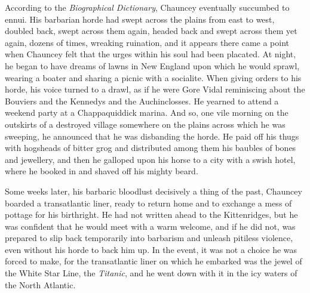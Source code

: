 According to the \emph{Biographical Dictionary}, Chauncey eventually succumbed to ennui. His barbarian horde had swept across the plains from east to west, doubled back, swept across them again, headed back and swept across them yet again, dozens of times, wreaking ruination, and it appears there came a point when Chauncey felt that the urges within his soul had been placated. At night, he began to have dreams of lawns in New England upon which he would sprawl, wearing a boater and sharing a picnic with a socialite. When giving orders to his horde, his voice turned to a drawl, as if he were Gore Vidal reminiscing about the Bouviers and the Kennedys and the Auchinclosses. He yearned to attend a weekend party at a Chappaquiddick marina. And so, one vile morning on the outskirts of a destroyed village somewhere on the plains across which he was sweeping, he announced that he was disbanding the horde. He paid off his thugs with hogsheads of bitter grog and distributed among them his baubles of bones and jewellery, and then he galloped upon his horse to a city with a swish hotel, where he booked in and shaved off his mighty beard.

Some weeks later, his barbaric bloodlust decisively a thing of the past, Chauncey boarded a transatlantic liner, ready to return home and to exchange a mess of pottage for his birthright. He had not written ahead to the Kittenridges, but he was confident that he would meet with a warm welcome, and if he did not, was prepared to slip back temporarily into barbarism and unleash pitiless violence, even without his horde to back him up. In the event, it was not a choice he was forced to make, for the transatlantic liner on which he embarked was the jewel of the White Star Line, the \emph{Titanic}, and he went down with it in the icy waters of the North Atlantic.